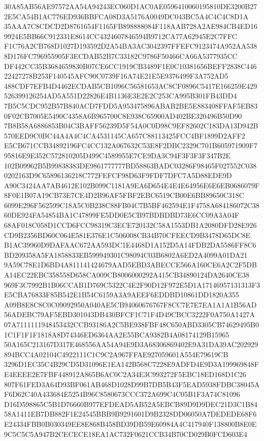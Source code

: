 \documentclass[UTF8,fontset=fandol,zihao=-4,a4paper]{ctexart}
\begin{document}
{{30A85AB56AE97572AA54A94243EC060D1AC0AE0596410060195810DE3200B272E5CA54B1AC776ED936BBFCA08D3A5176A0049DC043BC5A4C4C4C8D1A
35AAA7C8CDCD2D8761654F1165FB898888084F118AAB728A2AE984CB4ED169924E5BB66C912331E8614CC4324607846594B9712CA77A62945E2C7FFC
F1C76A2CB768D1027D193592D2A54BA3AC3042397FFEFC9123474A952AA5388D176FC796955905F3ECDAB52B7C33182C9786F50466CA66A5377935CC
DF442CC35B3684659830B07CE6CC1919CB3489F1E0C10381656BEFF2838C44622427278B253F140545AFC90C0739F16A74E21E5E9376499F3A752AD5
488CDF7EFB4D4462ECDAB5CB1096C56581653AC8CF0896C5417E166259E429526399126254AD5A551D22826E4B1136E3E2E2C253CA995B301FB43DD4
7B5C5CDC952B57B840ACD7FDD5A953475896ABAB2BE5E883408FFAF5EB830F02CB7005E5490C4358A6B965700C8E938C65900AD402BE320496B50D90
7B8B58A6886853B04C3BAFF56239D5F54A0C0D98C9EF82602C183DA13D942B570EED9C0BC44A4A4C4CA4531145CA657C88113425FCC4BF1899D2AFF2
E5CB671CCB34892196FC4CC132A067632C53E8F2DBC2329C701B605971909F795816E9E352C572810205D499C4589955E7CE9DA3C94F3F3F3F347B2E
102B09962B5B99838383DE9861777777BD58863BADC03286F98465F027552C0380202163D9C65896136218C772FEFCF98D63F9FDF7DFC7A5D88EDE9D
A90C3424AA7AB4612E102B099C1181A9EA6D654E4E4E64956E6E6EB0686079F8F0E1B07A19CB73E7CE4D2B96AF5FBF2EBC6519CB00E6BB89650C318C
6099E296F562599C18A5C0B238C88FB04C7B5BF462594E1F4758A684186072C3860DE924FA54854BA1C47899FE5DD0E5CB97BDBDBD73E6CC09A3A04F
68AF018C058D1CCD6FCC98319C3ECE720132C58A1553DB1A2080DFD28E926CD9B2356BD60C064E581E376E1C506008CB34B70CFEECD9B3478D65DC8E
B1AC39960D9DAFAAC672AA593DC1E4468D1A152D5A14FDB2DA5586FF8C6BD209358A5FA1858833EB599949301C98094C03B6802A6ED2A4099A01DA21
9A59C78E1D6BD4A811141424679AAD5EBD3ABECCE566A160CE6A2C2F5DBA14EC22EBC358558D658CA009CB8006000292A415CB34890124DA2640CE38
969F3C7992B1B06CCAB1D769C5322C4E2F90D12F972E5D1A17146957131313F3E5CBA76833F85B542E1B54C6159A3A9AEEF6EDDBD10861DD1820A355
A09B8E8C8C0C09092950A040AE5CB94060676767F8CC7E7E7EA1A1A1B56AD56ADEBC79AF5EBD301043DB430BFCF1C71F4D49CBCC3222F0A750A1427A
07A7111111948453432CCB93186A2C5BE938FBF48C650ABD3305CB74629495B01C1F1F1F1818A8D74346ED6364AA2E55BCA9382B4A08174129B15965
50A165C213167D317E468556AA54A94E9D3A68306869402E9A31DA39AC202929894BCC4A02104C4922111C1C9C2A967FFAE927059601A554E79619CB
3296D1EC35C4B29CD5D31096E1EA142B568C7228E9ADFD4E9D3A199969848FE4EEEE2E7FBF448912A865B6AC0C2A34E3C993272F5EBC18ED168D1C26
807F61FED3A64D93BF061AB468D1028D99B7DB5B43F5EAD5938FDBC38045AF6D62C40A433684E5254B96C8580673CCC372A699C4C05B1F3A74C81096
D16D598865C5B1D76660B977EFDEAD5AB52A5EBCB89D9D9DEC21D3C1B8458A1411EB7DB882F1E24545BBB9B9291601D9B2328DD06050A7DEDEDE68F6
E24334FBB0B030349EE8E868B458BD39DB59E60984A4C417940F138800B8E0E9C5C5C5A947B2CECECE18EA1AC732F0621CCB34B70CD029B0FCD603E4
}}
\end{document}
